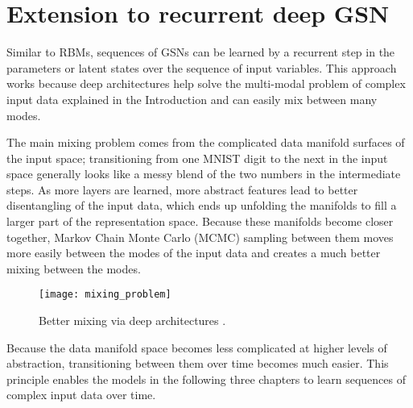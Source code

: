 \section{Extension to recurrent deep GSN}

Similar to RBMs, sequences of GSNs can be learned by a recurrent step in the parameters or latent states over the sequence of input variables. This approach works because deep architectures help solve the multi-modal problem of complex input data explained in the Introduction and can easily mix between many modes.

The main mixing problem comes from the complicated data manifold surfaces of the input space; transitioning from one MNIST digit to the next in the input space generally looks like a messy blend of the two numbers in the intermediate steps. As more layers are learned, more abstract features lead to better disentangling of the input data, which ends up unfolding the manifolds to fill a larger part of the representation space. Because these manifolds become closer together, Markov Chain Monte Carlo (MCMC) sampling between them moves more easily between the modes of the input data and creates a much better mixing between the modes.

\begin{figure}[h!]
  \centering
    \texttt{[image: mixing\_problem]}
\caption{Better mixing via deep architectures \cite{bengio_workshop}.}
\end{figure}

Because the data manifold space becomes less complicated at higher levels of abstraction, transitioning between them over time becomes much easier. This principle enables the models in the following three chapters to learn sequences of complex input data over time.


